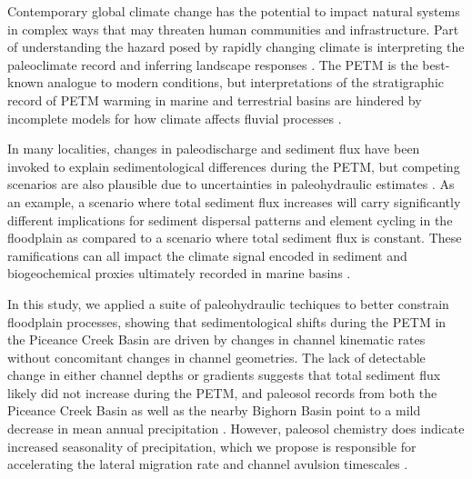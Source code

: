 \documentclass[draft]{compact_proposal}\usepackage[]{graphicx}\usepackage[]{color}
\begin{document}
Contemporary global climate change has the potential to impact natural systems in complex ways that may threaten human communities and infrastructure. 
Part of understanding the hazard posed by rapidly changing climate is interpreting the paleoclimate record and inferring landscape responses \parencite{syvitski_supply_2003}. 
The PETM is the best-known analogue to modern conditions, but interpretations of the stratigraphic record of PETM warming in marine and terrestrial basins are hindered by incomplete models for how climate affects fluvial processes \parencite{mcinerney_paleocene-eocene_2011, romans_environmental_2016}.

In many localities, changes in paleodischarge and sediment flux have been invoked to explain sedimentological differences during the PETM, but competing scenarios are also plausible due to uncertainties in paleohydraulic estimates \parencite{chen_estimating_2018, pujalte_massive_2015, foreman_fluvial_2012}.
As an example, a scenario where total sediment flux increases will carry significantly different implications for sediment dispersal patterns and element cycling in the floodplain as compared to a scenario where total sediment flux is constant. 
These ramifications can all impact the climate signal encoded in sediment and biogeochemical proxies ultimately recorded in marine basins \parencite{foreman_autogenic_2017, trampush_identifying_2017, straub_influence_2013}.

In this study, we applied a suite of paleohydraulic techiques to better constrain floodplain processes, showing that sedimentological shifts during the PETM in the Piceance Creek Basin are driven by changes in channel kinematic rates without concomitant changes in channel geometries.
The lack of detectable change in either channel depths or gradients suggests that total sediment flux likely did not increase during the PETM, and paleosol records from both the Piceance Creek Basin as well as the nearby Bighorn Basin point to a mild decrease in mean annual precipitation \parencite{kraus_transient_2007, lesko_increased_2019}.
However, paleosol chemistry does indicate increased seasonality of precipitation, which we propose is responsible for accelerating the lateral migration rate and channel avulsion timescales \parencite{lesko_increased_2019}.
\end{document}
